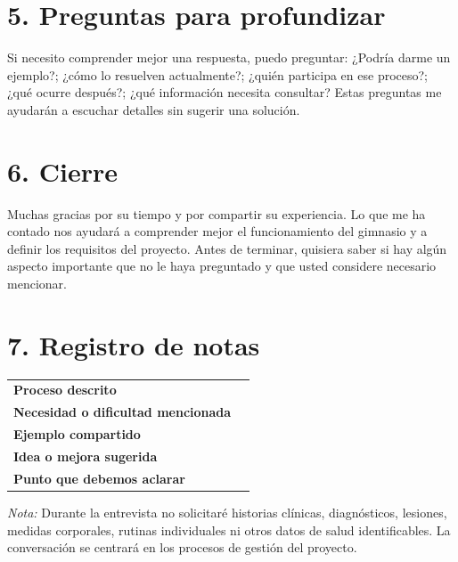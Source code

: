 \documentclass[10pt,letterpaper]{article}
\newcommand{\titulo}[1]{\section*{\textcolor{azul}{#1}}}
\begin{document}
\titulo{5. Preguntas para profundizar}
Si necesito comprender mejor una respuesta, puedo preguntar: ¿Podría darme un ejemplo?; ¿cómo lo resuelven actualmente?; ¿quién participa en ese proceso?; ¿qué ocurre después?; ¿qué información necesita consultar? Estas preguntas me ayudarán a escuchar detalles sin sugerir una solución.

\titulo{6. Cierre}
Muchas gracias por su tiempo y por compartir su experiencia. Lo que me ha contado nos ayudará a comprender mejor el funcionamiento del gimnasio y a definir los requisitos del proyecto. Antes de terminar, quisiera saber si hay algún aspecto importante que no le haya preguntado y que usted considere necesario mencionar.

\titulo{7. Registro de notas}
\begin{tabularx}{\linewidth}{@{}p{4.1cm}X@{}}
\textbf{Proceso descrito} & \rule{0pt}{0.8cm}\\
\textbf{Necesidad o dificultad mencionada} & \rule{0pt}{0.9cm}\\
\textbf{Ejemplo compartido} & \rule{0pt}{0.9cm}\\
\textbf{Idea o mejora sugerida} & \rule{0pt}{0.9cm}\\
\textbf{Punto que debemos aclarar} & \rule{0pt}{0.9cm}\\
\end{tabularx}

\vfill
{\small\textit{Nota:} Durante la entrevista no solicitaré historias clínicas, diagnósticos, lesiones, medidas corporales, rutinas individuales ni otros datos de salud identificables. La conversación se centrará en los procesos de gestión del proyecto.}


\clearpage
\end{document}
